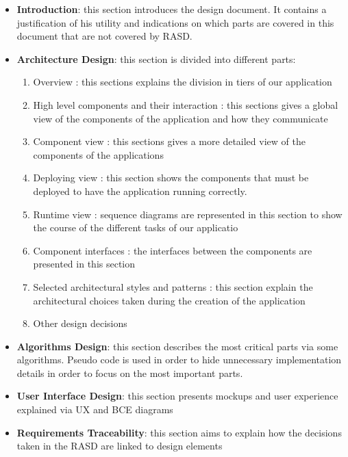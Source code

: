 \documentclass[a4paper]{article}
\begin{document}
\begin{itemize}
    \item \textbf{Introduction}: this section introduces the design document. It contains
a justification of his utility and indications on which parts are covered in
this document that are not covered by RASD.

\item \textbf{Architecture Design}: this section is divided into different parts:
\begin{enumerate}
    \item Overview : this sections explains the division in tiers of our application
    
    \item High level components and their interaction : this sections gives
a global view of the components of the application and how they
communicate

    \item Component view : this sections gives a more detailed view of the
components of the applications

    \item Deploying view : this section shows the components that must be
deployed to have the application running correctly.

    \item Runtime view : sequence diagrams are represented in this section to
show the course of the different tasks of our applicatio

    \item Component interfaces : the interfaces between the components are
presented in this section

    \item Selected architectural styles and patterns : this section explain the
architectural choices taken during the creation of the application

    \item Other design decisions
    
\end{enumerate}


\item \textbf{Algorithms Design}: this section describes the most critical parts via
some algorithms. Pseudo code is used in order to hide unnecessary implementation
details in order to focus on the most important parts.


\item \textbf{User Interface Design}: this section presents mockups and user experience
explained via UX and BCE diagrams


\item \textbf{Requirements Traceability}: this section aims to explain how the decisions
taken in the RASD are linked to design elements
\end{itemize}
\end{document}
